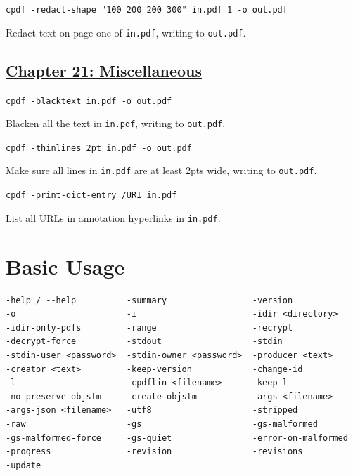 \documentclass{book}
\begin{document}
\begin{framed}\noindent\texttt{cpdf -redact-shape "100 200 200 300" in.pdf 1 -o out.pdf}\end{framed}

\noindent Redact text on page one of \texttt{in.pdf}, writing to \texttt{out.pdf}.

\section*{\hyperref[chap:misc]{Chapter 21: Miscellaneous}}

\begin{framed}\noindent\texttt{cpdf -blacktext in.pdf -o out.pdf}\end{framed}

\noindent Blacken all the text in \texttt{in.pdf}, writing to \texttt{out.pdf}.

\begin{framed}\noindent\texttt{cpdf -thinlines 2pt in.pdf -o out.pdf}\end{framed}

\noindent Make sure all lines in \texttt{in.pdf} are at least 2pts wide, writing to \texttt{out.pdf}.


\begin{framed}\noindent\texttt{cpdf -print-dict-entry /URI in.pdf}\end{framed}

\noindent List all URLs in annotation hyperlinks in \texttt{in.pdf}.

\pagestyle{empty}\thispagestyle{plain}
\cleardoublepage

\pagestyle{plain}
\tableofcontents\clearpage\pagestyle{empty}

\mainmatter
\pagestyle{fancy}



\chapter{Basic Usage}\label{chap:1}


\label{basicusage}
  \begin{framed}
  \small
\noindent\begin{verbatim}
-help / --help          -summary                 -version
-o                      -i                       -idir <directory>
-idir-only-pdfs         -range                   -recrypt                
-decrypt-force          -stdout                  -stdin
-stdin-user <password>  -stdin-owner <password>  -producer <text>        
-creator <text>         -keep-version            -change-id
-l                      -cpdflin <filename>      -keep-l
-no-preserve-objstm     -create-objstm           -args <filename>
-args-json <filename>   -utf8                    -stripped
-raw                    -gs                      -gs-malformed
-gs-malformed-force     -gs-quiet                -error-on-malformed
-progress               -revision                -revisions
-update\end{verbatim}\end{framed}
\end{document}
